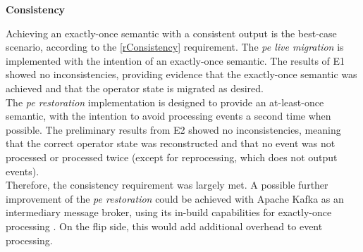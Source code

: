 \textbf{Consistency}\par
Achieving an exactly-once semantic with a consistent output is the best-case scenario, according to the \ref{rConsistency} requirement. The \textit{\acrshort{pe} live migration} is implemented with the intention of an exactly-once semantic. The results of E1 showed no inconsistencies, providing evidence that the exactly-once semantic was achieved and that the operator state is migrated as desired.\\
The \textit{\acrshort{pe} restoration} implementation is designed to provide an at-least-once semantic, with the intention to avoid processing events a second time when possible. The preliminary results from E2 showed no inconsistencies, meaning that the correct operator state was reconstructed and that no event was not processed or processed twice (except for reprocessing, which does not output events).\\
Therefore, the consistency requirement was largely met. A possible further improvement of the \textit{\acrshort{pe} restoration} could be achieved with Apache Kafka as an intermediary message broker, using its in-build capabilities for exactly-once processing \cite{Narkhede.2017}. On the flip side, this would add additional overhead to event processing.\par

